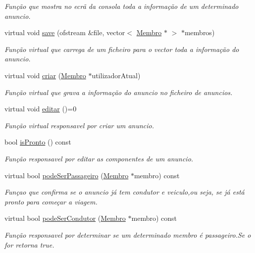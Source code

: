 \begin{DoxyCompactItemize}
\begin{DoxyCompactList}\small\item\em Função que mostra no ecrã da consola toda a informação de um determinado anuncio. \end{DoxyCompactList}\item 
virtual void \hyperlink{class_anuncio_a66e74841f18c8c0f95b4f3b66ce77797}{save} (ofstream \&file, vector$<$ \hyperlink{class_membro}{Membro} $\ast$ $>$ $\ast$membros)
\begin{DoxyCompactList}\small\item\em Função virtual que carrega de um ficheiro para o vector toda a informação do anuncio. \end{DoxyCompactList}\item 
virtual void \hyperlink{class_anuncio_a00fb20c3afcd57ef4edc07a09526bde4}{criar} (\hyperlink{class_membro}{Membro} $\ast$utilizador\+Atual)
\begin{DoxyCompactList}\small\item\em Função virtual que grava a informação do anuncio no ficheiro de anuncios. \end{DoxyCompactList}\item 
virtual void \hyperlink{class_anuncio_a82600e3de68746059d60206df6ceee56}{editar} ()=0
\begin{DoxyCompactList}\small\item\em Função virtual responsavel por criar um anuncio. \end{DoxyCompactList}\item 
bool \hyperlink{class_anuncio_a88bacb9aa1be4db0dfc8b8ce0c04b593}{is\+Pronto} () const 
\begin{DoxyCompactList}\small\item\em Função responsavel por editar as componentes de um anuncio. \end{DoxyCompactList}\item 
virtual bool \hyperlink{class_anuncio_a3267758a53d30c2a825ddf7e7cd3d8bd}{pode\+Ser\+Passageiro} (\hyperlink{class_membro}{Membro} $\ast$membro) const 
\begin{DoxyCompactList}\small\item\em Funçao que confirma se o anuncio já tem condutor e veiculo,ou seja, se já está pronto para começar a viagem. \end{DoxyCompactList}\item 
virtual bool \hyperlink{class_anuncio_ab2d7036cd0fbfd2c0eb8078006ca836e}{pode\+Ser\+Condutor} (\hyperlink{class_membro}{Membro} $\ast$membro) const 
\begin{DoxyCompactList}\small\item\em Função responsavel por determinar se um determinado membro é passageiro.\+Se o for retorna true. \end{DoxyCompactList}\item 

\end{DoxyCompactItemize}
